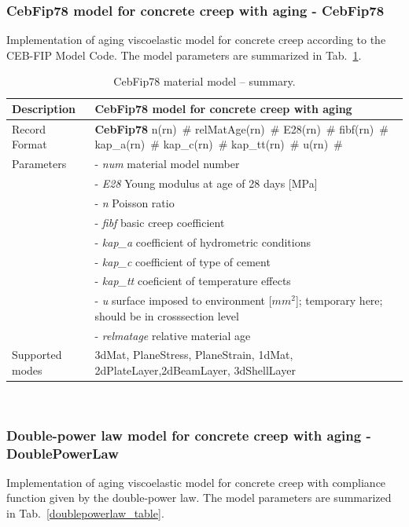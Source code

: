 \documentclass[a4paper]{article}
\newcommand{\descitem}[1]{{\noindent \bf #1}}
\newcommand{\elemparam}[2]{{{#1\tiny (#2)}~\#}}
\newcommand{\param}[1]{{\it #1}}
\newenvironment{mmt}{\begin{tabular}{|l|p{9cm}|}}{\end{tabular}\\}
\newenvironment{mmt}{\begin{tabular}{|l|l|}}{\end{tabular}\\}
\begin{document}
\subsubsection{CebFip78 model for concrete creep with aging - CebFip78}
Implementation of aging viscoelastic model for concrete creep
according to the CEB-FIP Model Code.
The model parameters are summarized
in Tab.~\ref{cebfip_table}.

\begin{table}[!htb]
\begin{mmt}
\hline
Description & CebFip78 model  for concrete creep with aging\\
\hline
Record Format & \descitem{CebFip78}  \elemparam{n}{rn}
\elemparam{relMatAge}{rn} \elemparam{E28}{rn} \elemparam{fibf}{rn} \elemparam{kap\_a}{rn}
\elemparam{kap\_c}{rn} \elemparam{kap\_tt}{rn} \elemparam{u}{rn}\\
Parameters &- \param{num} material model number\\
&- \param{E28} Young modulus at age of 28 days [MPa]\\
&- \param{n} Poisson ratio\\
&- \param{fibf} basic creep coefficient\\
&- \param{kap\_a} coefficient of hydrometric conditions\\
&- \param{kap\_c} coefficient of type of cement\\
&- \param{kap\_tt} coeficient of temperature effects\\
&- \param{u} surface imposed to environment [$mm^2$]; temporary here; should be in crosssection level\\
&- \param{relmatage} relative material age \\
Supported modes& 3dMat, PlaneStress, PlaneStrain, 1dMat,
2dPlateLayer,2dBeamLayer, 3dShellLayer\\
\hline
\end{mmt}
\caption{CebFip78 material model -- summary.}
\label{cebfip_table}
\end{table}



\subsubsection{Double-power law model for concrete creep with aging - DoublePowerLaw}
Implementation of aging viscoelastic model for concrete creep
with compliance function given by the double-power law.
The model parameters are summarized
in Tab.~\ref{doublepowerlaw_table}.
\end{document}
